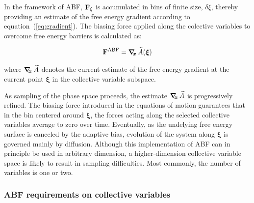 In the framework of ABF,
${\bf F}_\xi$ is accumulated in bins of finite size, $\delta \xi$,
thereby providing an estimate of the free energy gradient
according to equation~({\ref{eq:gradient}}).
The biasing force applied along the colective variables
to overcome free energy barriers is calculated as:

\begin{equation}
  \label{eq:abf}
  {\bf F}^{\rm ABF} = \mbox{\boldmath$\nabla_{\!\!x}\,$} \widetilde A({\mbox{\boldmath{$\xi$}}})
\end{equation}

where $\mbox{\boldmath$\nabla_{\!\!x}\,$} \widetilde A$ denotes the current estimate of the
free energy gradient at the current point $\bm{\xi}$ in the collective
variable subspace.

As sampling of the phase space proceeds, the estimate
$\mbox{\boldmath$\nabla_{\!\!x}\,$} \widetilde A$ is progressively refined. The biasing
force introduced in the equations of motion guarantees that in
the bin centered around $\bm{\xi}$,
the forces acting along the selected collective variables average
to zero over time. Eventually, as the undelying free energy surface is canceled
by the adaptive bias, evolution of the system along $\bm{\xi}$
is governed mainly by diffusion.
Although this implementation of ABF can in principle be used in 
arbitrary dimension, a higher-dimension collective variable space is likely
to result in sampling difficulties.
Most commonly, the number of variables is one or two.


\subsubsection*{ABF requirements on collective variables}
\label{sec:colvarbias_abf_req}

